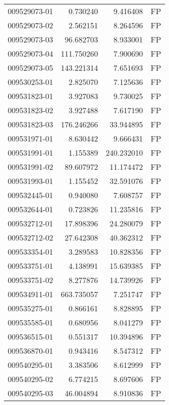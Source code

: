 \begin{tabular}{lrrl}
009529073-01 &    0.730240 &       9.416408 &   FP \\
009529073-02 &    2.562151 &       8.264596 &   FP \\
009529073-03 &   96.682703 &       8.933001 &   FP \\
009529073-04 &  111.750260 &       7.900690 &   FP \\
009529073-05 &  143.221314 &       7.651693 &   FP \\
009530253-01 &    2.825070 &       7.125636 &   FP \\
009531823-01 &    3.927083 &       9.730025 &   FP \\
009531823-02 &    3.927488 &       7.617190 &   FP \\
009531823-03 &  176.246266 &      33.944895 &   FP \\
009531971-01 &    8.630442 &       9.666431 &   FP \\
009531991-01 &    1.155389 &     240.232010 &   FP \\
009531991-02 &   89.607972 &      11.174472 &   FP \\
009531993-01 &    1.155452 &      32.591076 &   FP \\
009532445-01 &    0.940080 &       7.608757 &   FP \\
009532644-01 &    0.723826 &      11.235816 &   FP \\
009532712-01 &   17.898396 &      24.280079 &   FP \\
009532712-02 &   27.642308 &      40.362312 &   FP \\
009533354-01 &    3.289583 &      10.828356 &   FP \\
009533751-01 &    4.138991 &      15.639385 &   FP \\
009533751-02 &    8.277876 &      14.739926 &   FP \\
009534911-01 &  663.735057 &       7.251747 &   FP \\
009535275-01 &    0.866161 &       8.828895 &   FP \\
009535585-01 &    0.680956 &       8.041279 &   FP \\
009536515-01 &    0.551317 &      10.394896 &   FP \\
009536870-01 &    0.943416 &       8.547312 &   FP \\
009540295-01 &    3.383506 &       8.612999 &   FP \\
009540295-02 &    6.774215 &       8.697606 &   FP \\
009540295-03 &   46.004894 &       8.910836 &   FP \\

\end{tabular}
